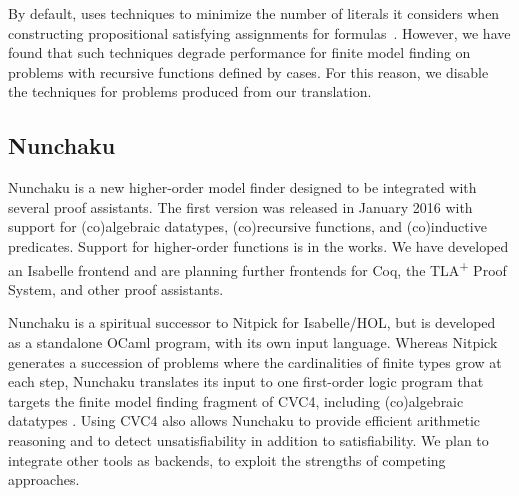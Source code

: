 By default, \cvc uses techniques to minimize the number of literals it
considers when constructing propositional satisfying assignments for
formulas~\cite{relevancy2007}. However, we have found that such techniques degrade
performance for finite model finding on problems with recursive functions
defined by cases. For this reason, we disable the techniques for
problems produced from our translation.



\subsection{Nunchaku}
\label{ssec:nunchaku}

Nunchaku is a new higher-order model finder designed to be integrated with
several proof assistants. The first version was released in January 2016
with support for (co)al\-gebraic datatypes, (co)recursive functions, and
(co)inductive predicates. Support for higher-order functions is in the works.
We have developed an Isabelle frontend and are
planning further frontends for Coq, %
the TLA\textsuperscript{+} Proof System, and other proof assistants.

Nunchaku is a spiritual successor to Nitpick \cite{blanchette-nipkow-2010} for
Isabelle/HOL, but is developed as a standalone
OCaml program, with its own input language. Whereas Nitpick generates a
succession of problems where the cardinalities of finite types grow at each step,
Nunchaku translates its input to one first-order logic program that targets
the finite model finding fragment of CVC4, including
(co)algebraic datatypes \cite{reynolds-blanchette-2015-codata}.
Using CVC4 also allows Nunchaku to provide efficient arithmetic
reasoning and to detect unsatisfiability in addition to satisfiability.
We plan to integrate other tools as backends, to exploit the
strengths of competing approaches.

